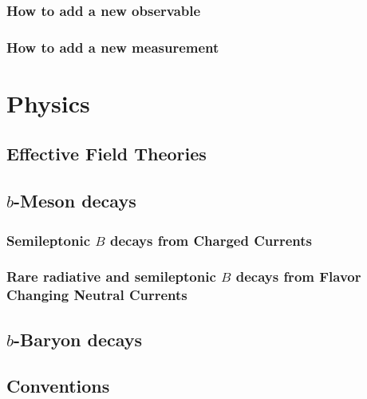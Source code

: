 \documentclass[
    paper=a4paper,
    DIV=15,
    BCRO=10mm,
    fontsize=11pt,
    bibliography=totoc
]{scrbook}
\begin{document}
\section{How to add a new observable}

\section{How to add a new measurement}

\part{Physics}

\chapter{Effective Field Theories}



\chapter{$b$-Meson decays}



\section{Semileptonic $B$ decays from Charged Currents}



\section{Rare radiative and semileptonic $B$ decays from Flavor Changing Neutral Currents}





\chapter{$b$-Baryon decays}



\appendix

\chapter{Conventions}



\backmatter

\printglossaries

\printbibliography
\end{document}
